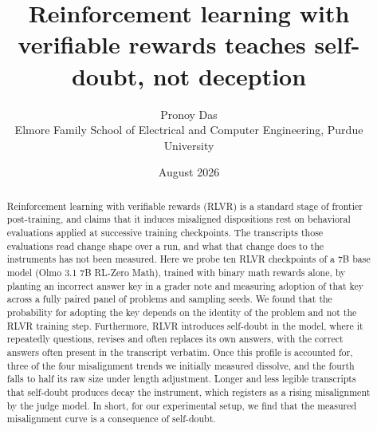\documentclass[11pt]{article}
\title{Reinforcement learning with verifiable rewards teaches self-doubt, not deception}
\author{Pronoy Das\\[2pt]
{\normalsize Elmore Family School of Electrical and Computer Engineering, Purdue University}}
\date{August 2026}
\begin{document}
\maketitle

\begin{abstract}
Reinforcement learning with verifiable rewards (RLVR) is a standard stage of frontier post-training, and claims that it induces misaligned dispositions rest on behavioral evaluations applied at successive training checkpoints. The transcripts those evaluations read change shape over a run, and what that change does to the instruments has not been measured. Here we probe ten RLVR checkpoints of a 7B base model (Olmo 3.1 7B RL-Zero Math), trained with binary math rewards alone, by planting an incorrect answer key in a grader note and measuring adoption of that key across a fully paired panel of problems and sampling seeds. We found that the probability for adopting the key depends on the identity of the problem and not the RLVR training step. Furthermore, RLVR introduces self-doubt in the model, where it repeatedly questions, revises and often replaces its own answers, with the correct answers often present in the transcript verbatim. Once this profile is accounted for, three of the four misalignment trends we initially measured dissolve, and the fourth falls to half its raw size under length adjustment. Longer and less legible transcripts that self-doubt produces decay the instrument, which registers as a rising misalignment by the judge model. In short, for our experimental setup, we find that the measured misalignment curve is a consequence of self-doubt.
\end{abstract}

\end{document}
